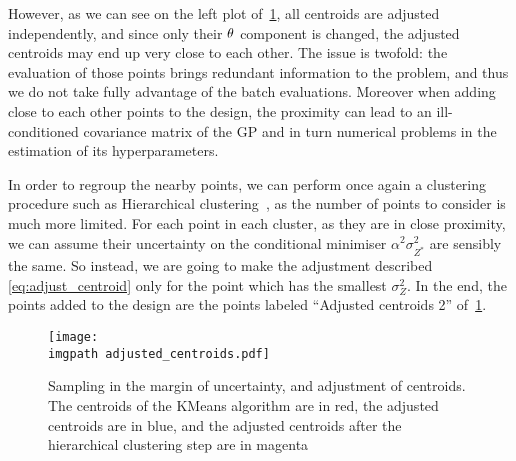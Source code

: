 \documentclass[../../Main_ManuscritThese.tex]{subfiles}
\newcommand\imgpath{/home/victor/acadwriting/Manuscrit/Text/Chapter4/img/}
\begin{document}
However, as we can see on the left plot
of~\cref{fig:adjusted_centroids}, all centroids are adjusted
independently, and since only their $\theta$ component is changed, the
adjusted centroids may end up very close to each other. The issue is
twofold: the evaluation of those points brings redundant information
to the problem, and thus we do not take fully advantage of the batch
evaluations. Moreover when adding close to each other points to the
design, the proximity can lead to an ill-conditioned covariance matrix
of the GP and in turn numerical problems in the estimation of its
hyperparameters.


In order to regroup the nearby points, we can perform once
again%
a clustering procedure such as Hierarchical
clustering~\cite{nielsen_hierarchical_2016}, as the number of points
to consider is much more limited.  For each point in each cluster, as
they are in close proximity, we can assume their uncertainty on the
conditional minimiser $\alpha^2\sigma^2_{Z^*}$ are sensibly the
same. So instead, we are going to make the adjustment described
\cref{eq:adjust_centroid} only for the point which has the smallest
$\sigma^2_Z$. In the end, the points added to the design are the
points labeled ``Adjusted centroids 2''
of~\cref{fig:adjusted_centroids}.


\begin{figure}[ht]
  \centering
  \texttt{[image: \\imgpath adjusted\_centroids.pdf]}
  \caption{\label{fig:adjusted_centroids} Sampling in the margin of uncertainty, and adjustment of centroids. The centroids of the KMeans algorithm are in red, the adjusted centroids are in blue, and the adjusted centroids after the hierarchical clustering step are in magenta}
\end{figure}
\end{document}
